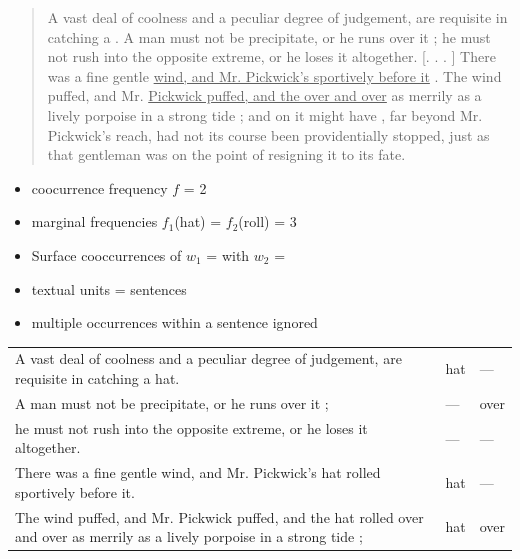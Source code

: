 \documentclass[a4paper,landscape,headrule,footrule,xetex]{foils}
\begin{document}
  \begin{quotation}
A vast deal of coolness and a peculiar degree of judgement, are requisite in catching a  . A man must
not be precipitate, or he runs over it ; he must not rush into the opposite extreme, or he loses it
altogether. [. . . ] There was a fine gentle \ul{wind, and Mr. Pickwick's   sportively before it} . The
wind puffed, and Mr. \ul{Pickwick puffed, and the   over and over} as merrily as a lively porpoise
in a strong tide ; and on it might have , far beyond Mr. Pickwick's reach, had not its course been
providentially stopped, just as that gentleman was on the point of resigning it to its fate.
  \end{quotation}
  \begin{itemize}
  \item coocurrence frequency $f$ = 2
  \item marginal frequencies $f_1$(hat) = $f_2$(roll) = 3
  \end{itemize}
  
\begin{itemize}
 \item Surface cooccurrences of 
    $w_1$ =  with $w_2$ = 
  \item textual units = sentences
  \item multiple occurrences within a sentence ignored
  \end{itemize}
  \begin{small}
    \begin{tabular}{p{}ll}
      A vast deal of coolness and a peculiar degree of judgement, are
      requisite in catching a hat.
      &
      hat
      &
      —
      \\
      A man must not be precipitate, or he runs over it ;
      &
      —
      &
      over
      \\
      he must not rush into the opposite extreme, or he loses it
      altogether.
      &
      —
      &
      —
      \\
      There was a fine gentle wind, and Mr. Pickwick's hat rolled
      sportively before it.
      &
      hat
      &
      —
      \\
      The wind puffed, and Mr. Pickwick puffed, and the hat rolled
      over and over as merrily as a lively porpoise in a strong tide ;
      &
      hat
      &
      over
    \end{tabular}
  \end{small}
\end{document}
